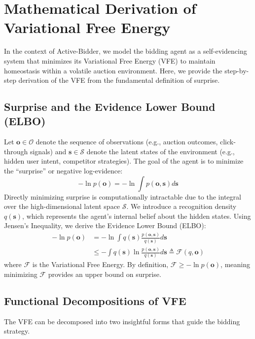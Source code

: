 \section{Mathematical Derivation of Variational Free Energy}
\label{appendix:derivation}

In the context of Active-Bidder, we model the bidding agent as a self-evidencing system that minimizes its Variational Free Energy (VFE) to maintain homeostasis within a volatile auction environment. Here, we provide the step-by-step derivation of the VFE from the fundamental definition of surprise.

\subsection{Surprise and the Evidence Lower Bound (ELBO)}
Let $\mathbf{o} \in \mathcal{O}$ denote the sequence of observations (e.g., auction outcomes, click-through signals) and $\mathbf{s} \in \mathcal{S}$ denote the latent states of the environment (e.g., hidden user intent, competitor strategies). The goal of the agent is to minimize the ``surprise'' or negative log-evidence:
\begin{equation}
    -\ln p(\mathbf{o}) = -\ln \int p(\mathbf{o}, \mathbf{s}) d\mathbf{s}
\end{equation}
Directly minimizing surprise is computationally intractable due to the integral over the high-dimensional latent space $\mathcal{S}$. We introduce a recognition density $q(\mathbf{s})$, which represents the agent's internal belief about the hidden states. Using Jensen's Inequality, we derive the Evidence Lower Bound (ELBO):
\begin{align}
    -\ln p(\mathbf{o}) &= -\ln \int q(\mathbf{s}) \frac{p(\mathbf{o}, \mathbf{s})}{q(\mathbf{s})} d\mathbf{s} \\
    &\leq -\int q(\mathbf{s}) \ln \frac{p(\mathbf{o}, \mathbf{s})}{q(\mathbf{s})} d\mathbf{s} \triangleq \mathcal{F}(q, \mathbf{o})
\end{align}
where $\mathcal{F}$ is the Variational Free Energy. By definition, $\mathcal{F} \geq -\ln p(\mathbf{o})$, meaning minimizing $\mathcal{F}$ provides an upper bound on surprise.

\subsection{Functional Decompositions of VFE}
The VFE can be decomposed into two insightful forms that guide the bidding strategy.

